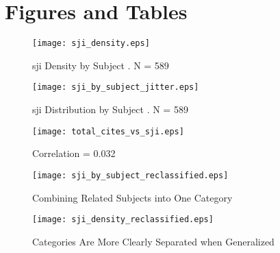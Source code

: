 \documentclass[12pt,english]{article}
\begin{document}
\vfill
\pagebreak{}
\clearpage

\section*{Figures and Tables}\label{sec:figTables}
\begin{figure}[ht]
\centering
\bigskip{}
\texttt{[image: sji\_density.eps]}
\caption{sji Density by Subject . N = 589}
\label{fig:fig1}
\end{figure}

\begin{figure}[ht]
\centering
\bigskip{}
\texttt{[image: sji\_by\_subject\_jitter.eps]}
\caption{sji Distribution by Subject . N = 589}
\label{fig:fig2}
\end{figure}


\begin{figure}
    \centering
    \texttt{[image: total\_cites\_vs\_sji.eps]}
    \caption{Correlation = 0.032}
    \label{fig:fig3}
\end{figure}


\begin{figure}
    \centering
    \texttt{[image: sji\_by\_subject\_reclassified.eps]}
    \caption{Combining Related Subjects into One Category}
    \label{fig:fig4}
\end{figure}


\begin{figure}
    \centering
    \texttt{[image: sji\_density\_reclassified.eps]}
    \caption{Categories Are More Clearly Separated when Generalized}
    \label{fig:fig5}
\end{figure}
\end{document}

